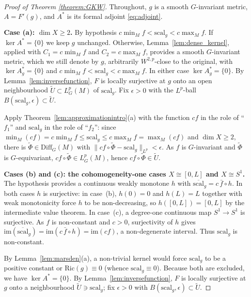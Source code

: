 \documentclass[12pt,a4paper]{amsart}
\theoremstyle{plain}
\theoremstyle{definition}
\theoremstyle{remark}
\newcommand{\ga}{\mathit{g}} %
\begin{document}
\begin{proof}[Proof of Theorem \ref{theorem:GKW}]
Throughout, $\ga$ is a smooth $G$-invariant metric, $A=F'(\ga)$, and $A^*$ is its formal adjoint \eqref{eq:adjoint}. 

\medskip
\noindent\textbf{Case \textup{(a):} $\dim X \ge 2$.}
By hypothesis $c\min_M f < \mathrm{scal}_{\ga} < c\max_M f$. If $\ker A^*=\{0\}$ we keep $\ga$ unchanged. Otherwise, Lemma~\ref{lem:dense_kernel}, applied with $C_1=c\min_M f$ and $C_2=c\max_M f$, provides a smooth $G$-invariant metric, which we still denote by $\ga$, arbitrarily $W^{2,p}$-close to the original, with $\ker A_{\ga}^*=\{0\}$ and $c\min_M f<\mathrm{scal}_{\ga}<c\max_M f$. In either case $\ker A_{\ga}^*=\{0\}$. By Lemma~\ref{lem:inversefunction}, $F$ is locally surjective at $\ga$ onto an open neighbourhood $\widetilde U\subset L^p_G(M)$ of $\mathrm{scal}_{\ga}$. Fix $\epsilon>0$ with the $L^p$-ball $B(\mathrm{scal}_{\ga},\epsilon)\subset\widetilde U$.

Apply Theorem~\ref{lem:approximationintro}(a) with the function $cf$ in the role of ``$f_1$'' and $\mathrm{scal}_{\ga}$ in the role of ``$f_2$'': since $\min_M(cf)=c\min_M f\le\mathrm{scal}_{\ga}\le c\max_M f=\max_M(cf)$ and $\dim X\ge2$, there is $\widetilde\Phi\in\mathrm{Diff}_G(M)$ with $\|cf\circ\widetilde\Phi-\mathrm{scal}_{\ga}\|_{L^p}<\epsilon$. As $f$ is $G$-invariant and $\widetilde\Phi$ is $G$-equivariant, $cf\circ\widetilde\Phi\in L^p_G(M)$, hence $cf\circ\widetilde\Phi\in\widetilde U$.

\medskip
\noindent\textbf{Cases \textup{(b) and \textup(c):} the cohomogeneity-one cases $X\cong[0,L]$ and $X\cong S^1$.}
The hypothesis provides a continuous weakly monotone $h$ with $\overline{\mathrm{scal}}_{\ga}=c\,\bar f\circ h$. In both cases $h$ is surjective: in case~(b), $h(0)=0$ and $h(L)=L$ together with weak monotonicity force $h$ to be non-decreasing, so $h([0,L])=[0,L]$ by the intermediate value theorem. In case~(c), a degree-one continuous map $S^1\to S^1$ is surjective. As $f$ is non-constant and $c>0$, surjectivity of $h$ gives $\mathrm{im}(\overline{\mathrm{scal}}_{\ga})=\mathrm{im}(c\,\bar f\circ h)=\mathrm{im}(cf)$, a non-degenerate interval. Thus $\mathrm{scal}_{\ga}$ is non-constant. 

By Lemma~\ref{lem:marsden}(a), a non-trivial kernel would force $\mathrm{scal}_{\ga}$ to be a positive constant or $\mathrm{Ric}(\ga)\equiv0$ (whence $\mathrm{scal}_{\ga}\equiv0$). Because both are excluded, we have $\ker A^*=\{0\}$. By Lemma~\ref{lem:inversefunction}, $F$ is locally surjective at $\ga$ onto a neighbourhood $\widetilde U\ni\mathrm{scal}_{\ga}$; fix $\epsilon>0$ with $B(\mathrm{scal}_{\ga},\epsilon)\subset\widetilde U$.


\end{proof}
\end{document}
